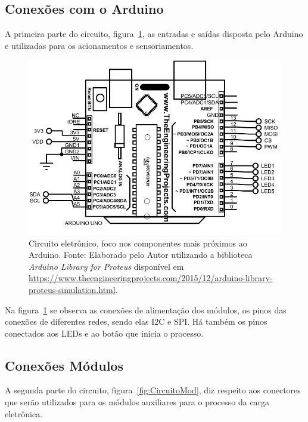 	
\subsection{Conexões com o Arduino}

A primeira parte do circuito,  figura~\ref{fig:CircuitoArduino}, as entradas e saídas disposta pelo Arduino e utilizadas para os acionamentos e sensoriamentos.

\begin{figure}[!htbp]
	\centering
	\includegraphics[scale=0.75]{imagens/CircuitoArduino.png}
	\caption{Circuito eletrônico, foco nos componentes mais próximos ao Arduino. Fonte: Elaborado pelo Autor utilizando a biblioteca \textit{Arduino Library for Proteus} disponível em \url{https://www.theengineeringprojects.com/2015/12/arduino-library-proteus-simulation.html}. 	}
	\label{fig:CircuitoArduino}
\end{figure}
\FloatBarrier

Na figura~\ref{fig:CircuitoArduino} se observa as conexões de alimentação dos módulos, os pinos das conexões de diferentes redes, sendo elas I2C e SPI. Há também os pinos conectados aos LEDs e ao botão que inicia o processo.

\subsection{Conexões Módulos}

A segunda parte do circuito,  figura~\ref{fig:CircuitoMod}, diz respeito aos conectores que serão utilizados para os módulos auxiliares para o processo da carga eletrônica.

